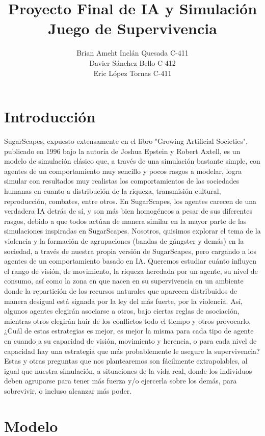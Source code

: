 \documentclass[11pt]{article}
\author{Brian Ameht Inclán Quesada C-411\\ Davier Sánchez Bello C-412\\ Eric López Tornas C-411}
\title{Proyecto Final de IA y Simulación \\ Juego de Supervivencia}
\date{}
\begin{document}
\maketitle
\newpage

\tableofcontents
\newpage

\section{Introducción}
SugarScapes, expuesto extensamente en el libro "Growing Artificial Societies", publicado en 1996 bajo la autoría de Joshua Epstein y Robert Axtell, es un modelo de simulación clásico que, a través de una simulación bastante simple, con agentes de un comportamiento muy sencillo y pocos rasgos a modelar, logra simular con resultados muy realistas los comportamientos de las sociedades humanas en cuanto a distribución de la riqueza, transmisión cultural, reproducción, combates, entre otros.
En SugarScapes, los agentes carecen de una verdadera IA detrás de sí, y son más bien homogéneos a pesar de sus diferentes rasgos, debido a que todos actúan de manera similar en la mayor parte de las simulaciones inspiradas en SugarScapes.
Nosotros, quisimos explorar el tema de la violencia y la formación de agrupaciones (bandas de gángster y demás) en la sociedad, a través de nuestra propia versión de SugarScapes, pero cargando a los agentes de un comportamiento basado en IA. Queremos estudiar cuánto influyen el rango de visión, de movimiento, la riqueza heredada por un agente, su nivel de consumo, así como la zona en que nacen en su supervivencia en un ambiente donde la repartición de los recursos naturales que aparecen distribuidos de manera desigual está signada por la ley del más fuerte, por la violencia. Así, algunos agentes elegirán asociarse a otros, bajo ciertas reglas de asociación, mientras otros elegirán huir de los conflictos todo el tiempo y otros provocarlo. ¿Cuál de estas estrategias es mejor, es mejor la misma para cada tipo de agente en cuando a su capacidad de visión, movimiento y herencia, o para cada nivel de capacidad hay una estrategia que más probablemente le asegure la supervivencia? Estas y otras preguntas que nos plantearemos son fácilmente extrapolables, al igual que nuestra simulación, a situaciones de la vida real, donde los individuos deben agruparse para tener más fuerza y/o ejercerla sobre los demás, para sobrevivir, o incluso alcanzar más poder.
\section{Modelo}
\end{document}
